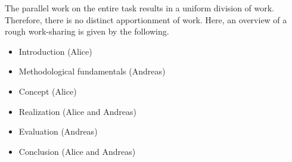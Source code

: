\newpage
{}
The parallel work on the entire task results in a uniform division of work. Therefore, there is no distinct apportionment of work. Here, an overview of a rough work-sharing is given by the following.

\begin{itemize}
\item Introduction (Alice)
\item Methodological fundamentals (Andreas)
\item Concept (Alice)
\item Realization (Alice and Andreas)
\item Evaluation (Andreas)
\item Conclusion (Alice and Andreas)
\end{itemize}
